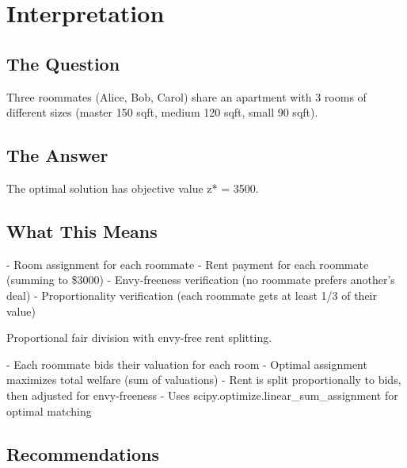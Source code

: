\documentclass[11pt, a4paper]{article}
\begin{document}
\section{Interpretation}

\subsection{The Question}
Three roommates (Alice, Bob, Carol) share an apartment with 3 rooms of different
sizes (master 150 sqft, medium 120 sqft, small 90 sqft).

\subsection{The Answer}

\begin{polyainsight}[title={Bottom Line}]
The optimal solution has objective value z* = 3500.
\end{polyainsight}

\subsection{What This Means}

- Room assignment for each roommate
- Rent payment for each roommate (summing to \$3000)
- Envy-freeness verification (no roommate prefers another's deal)
- Proportionality verification (each roommate gets at least 1/3 of their value)

Proportional fair division with envy-free rent splitting.

- Each roommate bids their valuation for each room
- Optimal assignment maximizes total welfare (sum of valuations)
- Rent is split proportionally to bids, then adjusted for envy-freeness
- Uses scipy.optimize.linear\_sum\_assignment for optimal matching



\subsection{Recommendations}
\end{document}
